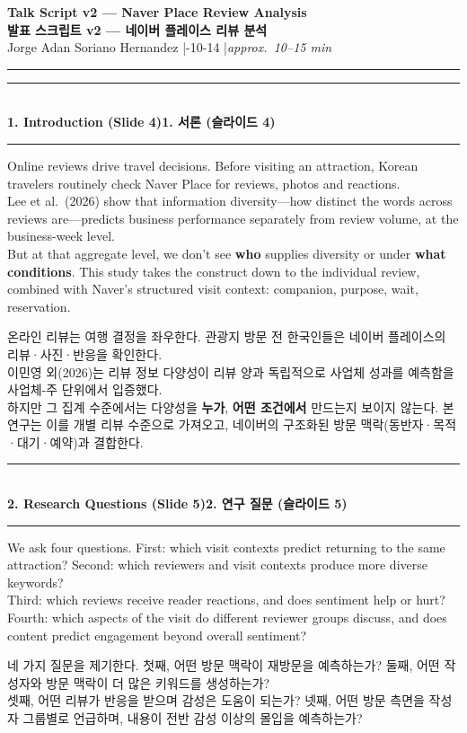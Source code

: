 \documentclass[10pt,a4paper]{article}
\newcommand{\sechead}[2]{%
  \vspace{6pt}%
  \noindent\rule{\linewidth}{0.6pt}\\[1pt]
  {\small\bfseries #1\hfill #2}\\[-3pt]
  \rule{\linewidth}{0.4pt}\par\vspace{2pt}%
}
\newcommand{\sent}[1]{#1\\[5pt]}
\newcommand{\bilingual}[2]{%
  \noindent%
  \begin{minipage}[t]{0.485\linewidth}
    \small #1
  \end{minipage}\hfill\vrule\hfill%
  \begin{minipage}[t]{0.483\linewidth}
    \small #2
  \end{minipage}\par\vspace{4pt}%
}
\begin{document}
\begin{center}
  {\large\bfseries Talk Script v2 --- Naver Place Review Analysis}\\[3pt]
  {\large\bfseries 발표 스크립트 v2 --- 네이버 플레이스 리뷰 분석}\\[2pt]
  {\small Jorge Adan Soriano Hernandez \quad|-10-14 \quad|\quad \textit{approx.\ 10--15 min}}
\end{center}
\rule{\linewidth}{0.8pt}


\sechead{1. Introduction (Slide 4)}{1. 서론 (슬라이드 4)}
\bilingual{%
  \sent{Online reviews drive travel decisions. Before visiting an attraction, Korean travelers routinely check Naver Place for reviews, photos and reactions.}
  \sent{Lee et al.\ (2026) show that information diversity---how distinct the words across reviews are---predicts business performance separately from review volume, at the business-week level.}
  \sent{But at that aggregate level, we don't see \textbf{who} supplies diversity or under \textbf{what conditions}. This study takes the construct down to the individual review, combined with Naver's structured visit context: companion, purpose, wait, reservation.}
}{%
  \sent{온라인 리뷰는 여행 결정을 좌우한다. 관광지 방문 전 한국인들은 네이버 플레이스의 리뷰·사진·반응을 확인한다.}
  \sent{이민영 외(2026)는 리뷰 정보 다양성이 리뷰 양과 독립적으로 사업체 성과를 예측함을 사업체-주 단위에서 입증했다.}
  \sent{하지만 그 집계 수준에서는 다양성을 \textbf{누가}, \textbf{어떤 조건에서} 만드는지 보이지 않는다. 본 연구는 이를 개별 리뷰 수준으로 가져오고, 네이버의 구조화된 방문 맥락(동반자·목적·대기·예약)과 결합한다.}
}

\sechead{2. Research Questions (Slide 5)}{2. 연구 질문 (슬라이드 5)}
\bilingual{%
  \sent{We ask four questions. First: which visit contexts predict returning to the same attraction? Second: which reviewers and visit contexts produce more diverse keywords?}
  \sent{Third: which reviews receive reader reactions, and does sentiment help or hurt? Fourth: which aspects of the visit do different reviewer groups discuss, and does content predict engagement beyond overall sentiment?}
}{%
  \sent{네 가지 질문을 제기한다. 첫째, 어떤 방문 맥락이 재방문을 예측하는가? 둘째, 어떤 작성자와 방문 맥락이 더 많은 키워드를 생성하는가?}
  \sent{셋째, 어떤 리뷰가 반응을 받으며 감성은 도움이 되는가? 넷째, 어떤 방문 측면을 작성자 그룹별로 언급하며, 내용이 전반 감성 이상의 몰입을 예측하는가?}
}
\end{document}
